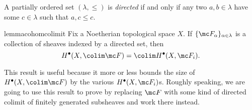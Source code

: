 \documentclass[../notes.tex]{subfiles}
\begin{document}
\begin{definition}
	A partially ordered set $(\lambda,\le)$ is \textit{directed} if and only if any two $a,b\in\lambda$ have some $c\in\lambda$ such that $a,c\le c$.
\end{definition}
\begin{restatable}{lemma}{cohomcolimit} \label{lem:cohom-colimit}
	Fix a Noetherian topological space $X$. If $\{\mc F_\alpha\}_{\alpha\in\lambda}$ is a collection of sheaves indexed by a directed set, then
	\[H^\bullet(X,\colim\mc F)=\colim H^\bullet(X,\mc F_i).\]
\end{restatable}
\noindent This result is useful because it more or less bounds the size of $H^\bullet(X,\colim\mc F)$ by the various $H^\bullet(X,\mc F_i)$s. Roughly speaking, we are going to use this result to prove  by replacing $\mc F$ with some kind of directed colimit of finitely generated subsheaves and work there instead.
\end{document}
